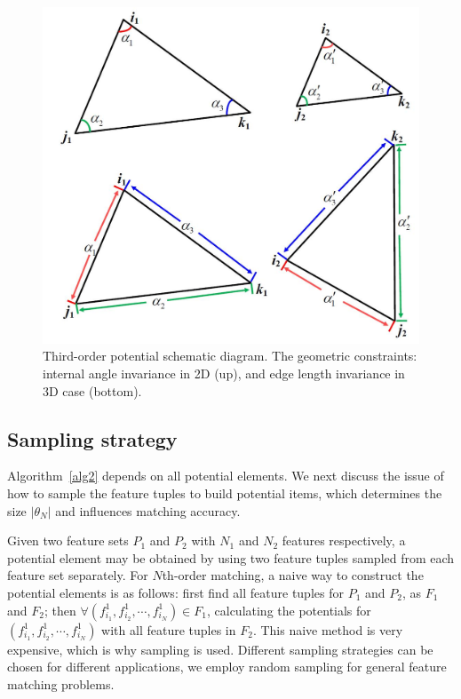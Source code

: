 \begin{figure}
\centering
  \includegraphics[width=0.8\linewidth]{figures/diagram.jpg}
  \caption{Third-order potential schematic diagram. The geometric constraints: internal angle invariance in 2D (up), and edge length invariance in 3D case (bottom).}
\label{fig:TO}
\end{figure}

\subsection{Sampling strategy}
\label{subsec:sampling}

Algorithm~\ref{alg2} depends on all potential elements. 
We next discuss the issue of how to sample the feature tuples to build potential items, which determines the size $|\theta_N|$ and influences matching accuracy.

Given two feature sets $P_1$ and $P_2$ with $N_1$ and $N_2$ features respectively,
a potential element may be obtained by using two feature tuples sampled from each feature set separately.
For $N$th-order matching, a naive way to construct the potential elements is as follows:
first find all feature tuples for $P_1$ and $P_2$, as $F_1$ and $F_2$; then $\forall (f_{i_1}^1, f_{i_2}^1, \cdots, f_{i_N}^1)\in F_1$,
calculating the potentials for $(f_{i_1}^1, f_{i_2}^1, \cdots, f_{i_N}^1)$ with all feature tuples in $F_2$.
This naive method is very expensive, which is why sampling is used.
Different sampling strategies can be chosen for different applications,
we employ random sampling for general feature matching problems. 

